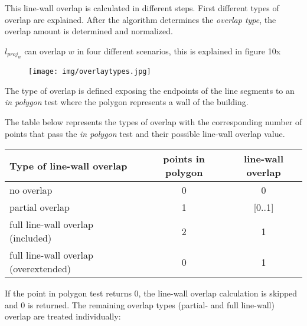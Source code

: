 \documentclass[10pt]{article}
\begin{document}
	This line-wall overlap is calculated in different steps.
	First different types of overlap are explained. After the algorithm
	determines the \emph{overlap type}, the overlap amount is determined and
	normalized.

	$l_{proj_w}$ can overlap $w$ in four different scenarios, this is explained
	in figure 10x %

\begin{figure}[!ht]
\centering
\texttt{[image: img/overlaytypes.jpg]}
\end{figure}
	


	The type of overlap is defined exposing the endpoints of the line
	segments to an \emph{in polygon} test where the polygon represents a 
	wall of the building.

	The table below represents the types of overlap with the corresponding number of points
	that pass the \emph{in polygon} test and their possible line-wall overlap
	value.\\ 

	\begin{tabular}{|l||c|c|}
	\hline
	Type of line-wall overlap 			&	points in polygon 			& line-wall overlap \\
	\hline
	\hline
	no overlap					&	0					& 0		\\
	\hline
	partial overlap 				&	1					& [0..1]	\\
	\hline
	full line-wall overlap (included)		&	2					& 1		\\
	\hline
	full line-wall overlap (overextended)		&  	0					& 1 		\\
	\hline
	\end{tabular}

	If the point in polygon test returns 0, the line-wall overlap calculation
	is skipped and 0 is returned. The remaining overlap types (partial- and full
	line-wall) overlap are treated individually:\\
\end{document}
